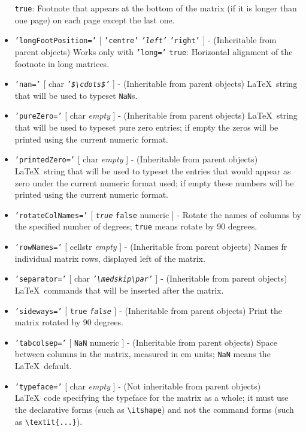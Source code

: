 \begin{itemize}
  \texttt{true}: Footnote that appears at the bottom of the matrix (if
  it is longer than one page) on each page except the last one.
\item
  \texttt{'longFootPosition='} {[} \texttt{'centre'} \textbar{}
  \emph{\texttt{'left'}} \textbar{} \texttt{'right'} {]} - (Inheritable
  from parent objects) Works only with \texttt{'long='} \texttt{true}:
  Horizontal alignment of the footnote in long matrices.
\item
  \texttt{'nan='} {[} char \textbar{}
  \emph{\texttt{'\$\textbackslash{}cdots\$'}} {]} - (Inheritable from
  parent objects) \LaTeX~string that will be used to typeset
  \texttt{NaN}s.
\item
  \texttt{'pureZero='} {[} char \textbar{} \emph{empty} {]} -
  (Inheritable from parent objects) \LaTeX~string that will be used to
  typeset pure zero entries; if empty the zeros will be printed using
  the current numeric format.
\item
  \texttt{'printedZero='} {[} char \textbar{} \emph{empty} {]} -
  (Inheritable from parent objects) \LaTeX~string that will be used to
  typeset the entries that would appear as zero under the current
  numeric format used; if empty these numbers will be printed using the
  current numeric format.
\item
  \texttt{'rotateColNames='} {[} \emph{\texttt{true}} \textbar{}
  \texttt{false} \textbar{} numeric {]} - Rotate the names of columns by
  the specified number of degrees; \texttt{true} means rotate by 90
  degrees.
\item
  \texttt{'rowNames='} {[} cellstr \textbar{} \emph{empty} {]} -
  (Inheritable from parent objects) Names fr individual matrix rows,
  displayed left of the matrix.
\item
  \texttt{'separator='} {[} char \textbar{}
  \emph{\texttt{'\textbackslash{}medskip\textbackslash{}par'}} {]} -
  (Inheritable from parent objects) \LaTeX~commands that will be
  inserted after the matrix.
\item
  \texttt{'sideways='} {[} \texttt{true} \textbar{}
  \emph{\texttt{false}} {]} - (Inheritable from parent objects) Print
  the matrix rotated by 90 degrees.
\item
  \texttt{'tabcolsep='} {[} \texttt{NaN} \textbar{} numeric {]} -
  (Inheritable from parent objects) Space between columns in the matrix,
  measured in em units; \texttt{NaN} means the \LaTeX~default.
\item
  \texttt{'typeface='} {[} char \textbar{} \emph{empty} {]} - (Not
  inheritable from parent objects) \LaTeX~code specifying the typeface
  for the matrix as a whole; it must use the declarative forms (such as
  \texttt{\textbackslash{}itshape}) and not the command forms (such as
  \texttt{\textbackslash{}textit\{...\}}).
\end{itemize}

